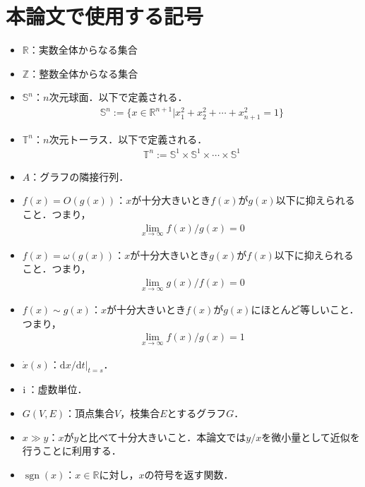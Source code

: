 \documentclass[../main]{subfiles}
\begin{document}
\chapter*{本論文で使用する記号}
\begin{itemize}
    \item
    $\mathbb{R}$：実数全体からなる集合
    \item
    $\mathbb{Z}$：整数全体からなる集合
    \item
    $\mathbb{S}^n$：$n$次元球面．以下で定義される．
    \begin{align*}
        \mathbb{S}^n:=\{x\in\mathbb{R}^{n+1}|x_1^2+x_2^2+\cdots+x_{n+1}^2=1\}
    \end{align*}    
    \item
    $\mathbb{T}^n$：$n$次元トーラス．以下で定義される．
    \begin{align*}
        \mathbb{T}^n:=\mathbb{S}^1\times\mathbb{S}^1\times \cdots\times \mathbb{S}^1
    \end{align*}
    \item 
    $A$：グラフの隣接行列．
    \item
    $f(x)=O(g(x))$：$x$が十分大きいとき$f(x)$が$g(x)$以下に抑えられること．つまり，
    \begin{align*}
        \lim_{x\to\infty}f(x)/g(x)=0
    \end{align*}
    \item
    $f(x)=\omega(g(x))$：$x$が十分大きいとき$g(x)$が$f(x)$以下に抑えられること．つまり，
    \begin{align*}
        \lim_{x\to\infty}g(x)/f(x)=0
    \end{align*}
    \item
    $f(x)\sim g(x)$：$x$が十分大きいとき$f(x)$が$g(x)$にほとんど等しいこと．つまり，
    \begin{align*}
        \lim_{x\to\infty}f(x)/g(x)=1
    \end{align*}    
    \item
    $\dot{x}(s)$：$\mathrm{d}x/\mathrm{d}t|_{t=s}$．
    \item
    ${\mathrm i\,}$：虚数単位．
    \item
    $G(V,E)$：頂点集合$V$，枝集合$E$とするグラフ$G$．
    \item
    $x\gg y$：$x$が$y$と比べて十分大きいこと．本論文では$y/x$を微小量として近似を行うことに利用する．
    \item
    $\operatorname{sgn}(x)$：$x\in\mathbb{R}$に対し，$x$の符号を返す関数．
\end{itemize}
\end{document}
